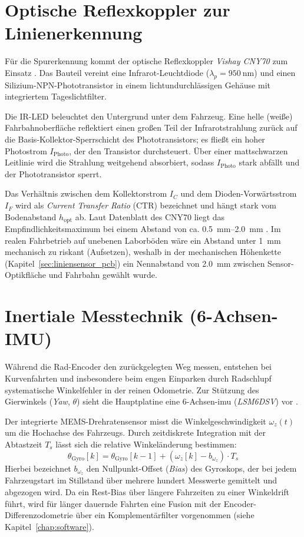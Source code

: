 \section{Optische Reflexkoppler zur Linienerkennung}
\label{sec:cny70_grundlagen}
Für die Spurerkennung kommt der optische Reflexkoppler \emph{Vishay CNY70} zum Einsatz \cite{Vishay_CNY70}. Das Bauteil vereint eine Infrarot-Leuchtdiode ($\lambda_p = \qty{950}{\nano\meter}$) und einen Silizium-NPN-Phototransistor in einem lichtundurchlässigen Gehäuse mit integriertem Tageslichtfilter.

Die IR-LED beleuchtet den Untergrund unter dem Fahrzeug. Eine helle (weiße) Fahrbahnoberfläche reflektiert einen großen Teil der Infrarotstrahlung zurück auf die Basis-Kollektor-Sperrschicht des Phototransistors; es fließt ein hoher Photostrom $I_{\mathrm{Photo}}$, der den Transistor durchsteuert. Über einer mattschwarzen Leitlinie wird die Strahlung weitgehend absorbiert, sodass $I_{\mathrm{Photo}}$ stark abfällt und der Phototransistor sperrt.

Das Verhältnis zwischen dem Kollektorstrom $I_C$ und dem Dioden-Vorwärtsstrom $I_F$ wird als \emph{Current Transfer Ratio} ($\mathrm{CTR}$) bezeichnet und hängt stark vom Bodenabstand $h_{\mathrm{opt}}$ ab. Laut Datenblatt des CNY70 liegt das Empfindlichkeitsmaximum bei einem Abstand von ca. \qtyrange{0,5}{2,0}{\milli\meter} \cite{Vishay_CNY70}. Im realen Fahrbetrieb auf unebenen Laborböden wäre ein Abstand unter \qty{1}{\milli\meter} mechanisch zu riskant (Aufsetzen), weshalb in der mechanischen Höhenkette (Kapitel~\ref{sec:liniensensor_pcb}) ein Nennabstand von \qty{2,0}{\milli\meter} zwischen Sensor-Optikfläche und Fahrbahn gewählt wurde.

\section{Inertiale Messtechnik (6-Achsen-IMU)}
\label{sec:imu_grundlagen}
Während die Rad-Encoder den zurückgelegten Weg messen, entstehen bei Kurvenfahrten und insbesondere beim engen Einparken durch Radschlupf systematische Winkelfehler in der reinen Odometrie. Zur Stützung des Gierwinkels (\emph{Yaw}, $\theta$) sieht die Hauptplatine eine 6-Achsen-\gls{imu} (\emph{LSM6DSV}) vor \cite{ST_LSM6DSV}.

Der integrierte MEMS-Drehratensensor misst die Winkelgeschwindigkeit $\omega_z(t)$ um die Hochachse des Fahrzeugs. Durch zeitdiskrete Integration mit der Abtastzeit $T_s$ lässt sich die relative Winkeländerung bestimmen:
\begin{equation}
  \theta_{\mathrm{Gyro}}[k] = \theta_{\mathrm{Gyro}}[k-1] + (\omega_z[k] - b_{\omega_z}) \cdot T_s
  \label{eq:gyro_int}
\end{equation}
Hierbei bezeichnet $b_{\omega_z}$ den Nullpunkt-Offset (\emph{Bias}) des Gyroskops, der bei jedem Fahrzeugstart im Stillstand über mehrere hundert Messwerte gemittelt und abgezogen wird. Da ein Rest-Bias über längere Fahrzeiten zu einer Winkeldrift führt, wird für länger dauernde Fahrten eine Fusion mit der Encoder-Differenzodometrie über ein Komplementärfilter vorgenommen (siehe Kapitel~\ref{chap:software}).


